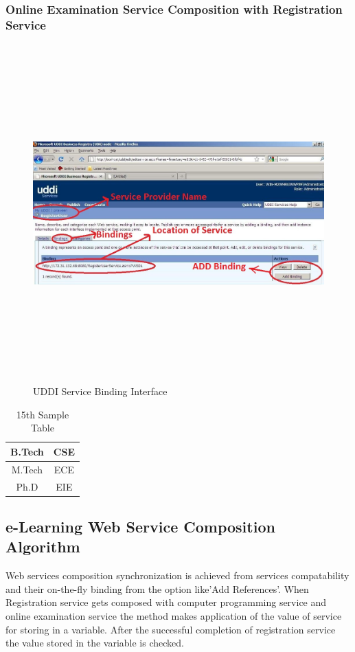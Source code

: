 \subsubsection{Online Examination Service  Composition with Registration Service}
\Blindtext
\begin{figure}[h!]
 \centering
 \includegraphics[width=16cm,height=13cm]{uddi_service_binding_interface.jpg}
 \caption{UDDI Service Binding Interface}
\end{figure}

\begin{table}
 \begin{center}
 \caption{15th Sample Table}
 \begin{tabular}{|c|c|}
 \hline
 B.Tech & CSE\\
 \hline
 M.Tech & ECE\\
 \hline
 Ph.D & EIE\\
 \hline 
 \end{tabular}
 \end{center}
\end{table}
\subsection{e-Learning Web Service Composition Algorithm}
Web services composition synchronization is achieved from services compatability and their on-the-fly binding from the option like'Add References'. When Registration service gets composed with computer programming service and online examination service the method makes application of the value of service for storing in a variable. 
After the successful completion of registration service the value stored in the variable is checked.     

